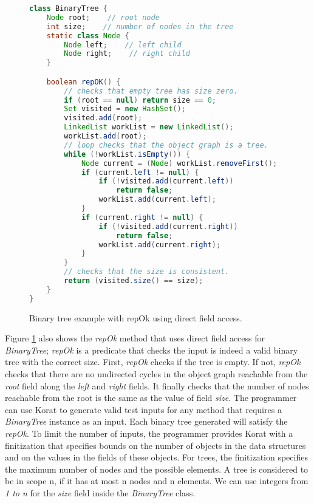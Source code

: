 \begin{figure}
\centering
\begin{lstlisting}[language=Java]
class BinaryTree {
    Node root;    // root node
    int size;    // number of nodes in the tree
    static class Node {
        Node left;    // left child
        Node right;    // right child
    }

    boolean repOK() {
        // checks that empty tree has size zero.
        if (root == null) return size == 0;
        Set visited = new HashSet();
        visited.add(root);
        LinkedList workList = new LinkedList();
        workList.add(root);
        // loop checks that the object graph is a tree.
        while (!workList.isEmpty()) {
            Node current = (Node) workList.removeFirst();
            if (current.left != null) {
                if (!visited.add(current.left))
                    return false;
                workList.add(current.left);
            }
            if (current.right != null) {
                if (!visited.add(current.right))
                    return false;
                workList.add(current.right);
            }
        }
        // checks that the size is consistent.
        return (visited.size() == size);
    }
}
\end{lstlisting}
\caption{Binary tree example with repOk using direct field access.}
\label{fig:btreeDirectRepOk}
\end{figure}

\para
Figure \ref{fig:btreeDirectRepOk} also shows the \emph{repOk} method that uses direct field access for \emph{BinaryTree}; \emph{repOk} is a predicate that checks the input is indeed a valid binary tree with the correct size. First, \emph{repOk} checks if the tree is empty. If not, \emph{repOk} checks that there are no undirected cycles in the object graph reachable from the \emph{root} field along the \emph{left} and \emph{right} fields. It finally checks that the number of nodes reachable from the root is the same as the value of field \emph{size}. The programmer can use Korat to generate valid test inputs for any method that requires a \emph{BinaryTree} instance as an input. Each binary tree generated will satisfy the \emph{repOk}. To limit the number of inputs, the programmer provides Korat with a finitization that specifies bounds on the number of objects in the data structures and on the values in the fields of these objects. For trees, the finitization specifies the maximum number of nodes and the possible elements. A tree is considered to be in scope n, if it has at most n nodes and n elements. We can use integers from \emph{1 to n} for the \emph{size} field inside the \emph{BinaryTree} class.


